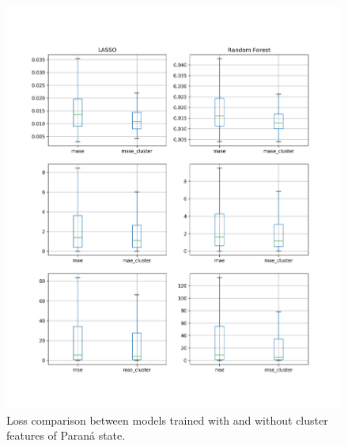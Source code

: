 \documentclass[12pt]{report}
\begin{document}
\begin{figure}
\centering
\includegraphics[width=\textwidth]{compar_fore_cluster_PR.png}
\caption{Loss comparison between models trained with and without cluster features of Paraná state.}
\label{fig:cluster_compar_pr}
\end{figure}
\end{document}
